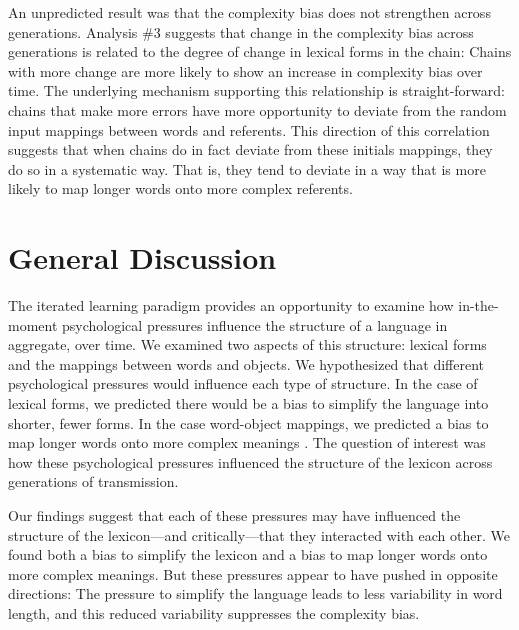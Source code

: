 An unpredicted result was that the complexity bias does not strengthen across generations. Analysis \#3 suggests that change in the complexity bias across generations is related to the degree of change in lexical forms in the chain: Chains with more change are more likely to show an increase in complexity bias over time. The underlying mechanism supporting this relationship is straight-forward: chains that make more errors have more opportunity to deviate from the random input mappings between words and referents. This direction of this correlation suggests that when chains do in fact deviate from these initials mappings, they do so in a systematic way. That is, they tend to deviate in a way that is more likely to map longer words onto more complex referents.

\section{General Discussion}

The iterated learning paradigm provides an opportunity to examine how in-the-moment psychological pressures influence the structure of a language in aggregate, over time. We examined two aspects of this structure: lexical forms and the mappings between words and objects. We hypothesized that different psychological pressures would influence each type of structure. In the case of lexical forms, we predicted there would be a bias to simplify the language into shorter, fewer forms. In the case word-object mappings, we predicted a bias to map longer words onto more complex meanings \cite{lewisstructure2014}. The question of interest was how these psychological pressures influenced the structure of the lexicon across generations of transmission. 

Our findings suggest that each of these pressures may have influenced the structure of the lexicon---and critically---that they interacted with each other. We found both a bias to simplify the lexicon and a bias to map longer words onto more complex meanings. But these pressures appear to have pushed in opposite directions: The pressure to simplify the language leads to less variability in word length, and this reduced variability suppresses the complexity bias. 

